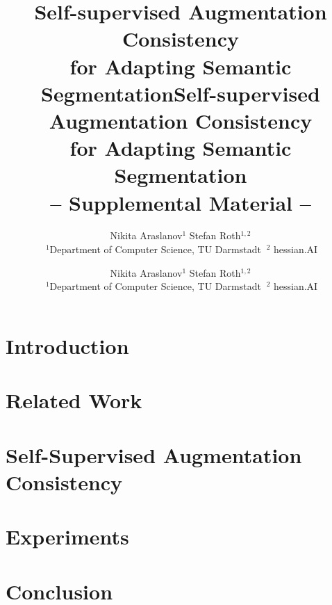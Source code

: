 \documentclass[final]{cvpr}
\begin{document}
\title{Self-supervised Augmentation Consistency \\for Adapting Semantic Segmentation}

\author{Nikita Araslanov$^1$ \hspace{1cm} Stefan Roth$^{1,2}$\\
$\ ^1$Department of Computer Science, TU Darmstadt \hspace{1cm} $\ ^2$ hessian.AI}

\maketitle
\thispagestyle{fancy}

\begin{abstract}

\end{abstract}

\section{Introduction}
\label{sec:intro}


\pagestyle{plain}
\section{Related Work}


\section{Self-Supervised Augmentation Consistency}


\section{Experiments}
\label{sec:exp}


\section{Conclusion}


{\small


}

\clearpage
{}
\appendix

\title{Self-supervised Augmentation Consistency \\for Adapting Semantic Segmentation\\[1mm]\large -- Supplemental Material --}
\author{Nikita Araslanov$^1$ \hspace{1cm} Stefan Roth$^{1,2}$\\
$\ ^1$Department of Computer Science, TU Darmstadt \hspace{1cm} $\ ^2$ hessian.AI}
\end{document}
